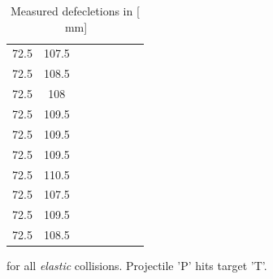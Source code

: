 \documentclass{scrreprt}
\newcommand{\unit}[1]{\ensuremath{\, \mathrm{#1}}}
\renewcommand{\emph}[1]{\textit{#1}}
\begin{document}
\begin{table}[H]
\begin{tabular}{ccp{1.5cm}ccp{1.5cm}cc}
     72.5 &         107.5 &            &            &            &            &            &            \\
     72.5 &         108.5 &            &            &            &            &            &            \\
     72.5 &         108 &            &            &            &            &            &            \\
     72.5 &         109.5 &            &            &            &            &            &            \\
     72.5 &         109.5 &            &            &            &            &            &            \\
     72.5 &         109.5 &            &            &            &            &            &            \\
     72.5 &         110.5 &            &            &            &            &            &            \\
     72.5 &         107.5 &            &            &            &            &            &            \\
     72.5 &         109.5 &            &            &            &            &            &            \\
     72.5 &         108.5 &            &            &            &            &            &            \\
\end{tabular}  
\caption{Measured defecletions in [$\unit{mm}$]} for all \emph{elastic} collisions. Projectile 'P' hits target 'T'.   
\end{table}
\end{document}
